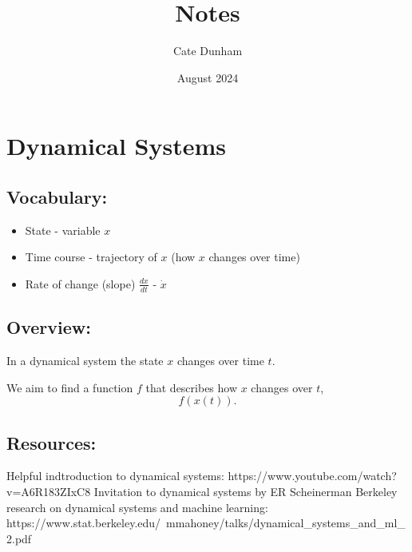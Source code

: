 \documentclass{article}
\title{Notes}
\author{Cate Dunham}
\date{August 2024}
\begin{document}
\maketitle

\section{Dynamical Systems}

\subsection{Vocabulary:}
\begin{itemize}
    \item State - variable $x$
    \item Time course - trajectory of $x$ (how $x$ changes over time)
    \item Rate of change (slope) $\frac{dx}{dt}$ - $\dot{x}$
\end{itemize}

\subsection{Overview:}
In a dynamical system the state $x$ changes over time $t$.

We aim to find a function $f$ that describes how $x$ changes over $t$, 
\begin{equation}
    f(x(t)).
\end{equation}

\subsection{Resources:}
Helpful indtroduction to dynamical systems: https://www.youtube.com/watch?v=A6R183ZIxC8
Invitation to dynamical systems by ER Scheinerman
Berkeley research on dynamical systems and machine learning: https://www.stat.berkeley.edu/~mmahoney/talks/dynamical_systems_and_ml_2.pdf
\end{document}
